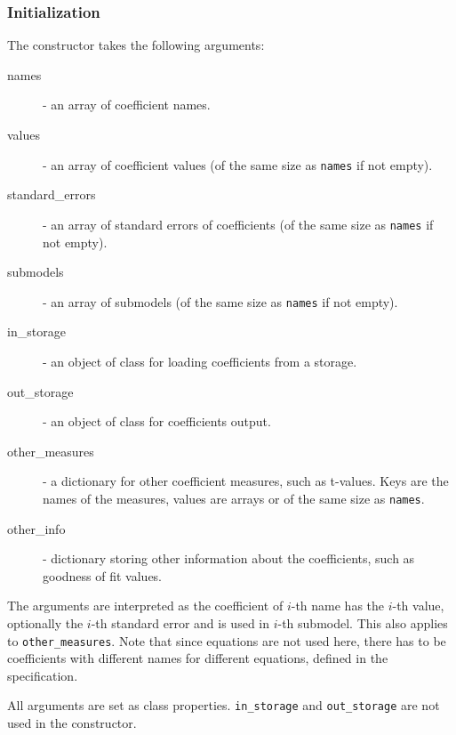 {\subsubsection{Initialization}
The constructor takes the following arguments:
\begin{description}
\item[names] - an array of coefficient \coefficientsindex names.
\item[values] - an array of coefficient \coefficientsindex values (of the same size as
  \verb|names| if not empty).
\item[standard_errors] - an array of standard errors of coefficients \coefficientsindex (of the
  same size as \verb|names| if not empty).
\item[submodels] - an array of submodels (of the same size as \verb|names| if
  not empty).
\item[in_storage] - an object of class  for loading
  coefficients \coefficientsindex from a storage.
\item[out_storage] - an object of class  for coefficients \coefficientsindex
  output.
\item[other_measures] - a dictionary for other coefficient \coefficientsindex measures, such as
  t-values. Keys are the names of the measures, values are arrays or of
  the same size as \verb|names|.
\item[other_info] - dictionary storing other information about the
  coefficients, \coefficientsindex such as goodness of fit values.
\end{description}
The arguments are interpreted as the coefficient \coefficientsindex of $i$-th name has the $i$-th
value, optionally the $i$-th standard error and is used in $i$-th
submodel. This also applies to \verb|other_measures|. Note that since
equations are not used here, there has to be coefficients \coefficientsindex with different names
for different equations, defined in the specification.

All arguments are set as class properties. \verb|in_storage| and
\verb|out_storage| are not used in the constructor.

%
}
